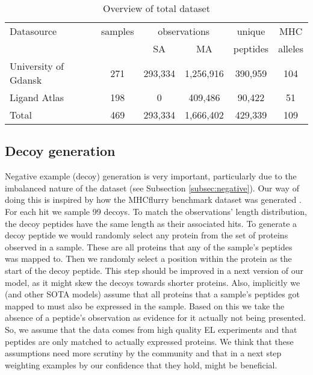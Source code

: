 \documentclass[msc,deptreport,ai]{infthesis} %
\begin{document}
	
		\begin{table}[H]
		\vskip 3mm
		\begin{center}
		\begin{small}
		\begin{sc}
		\begin{tabular}{| l | c | c c | c | c |}
		\hline
		Datasource			& samples		& \multicolumn{2}{c|}{observations} 	& unique  		& \gls{MHC} \\
						&			& \gls{SA}		& \gls{MA}		& peptides		& alleles \\
		\hline
		\hline
		University of Gdansk	& 271			& 293,334		& 1,256,916		& 390,959		& 104 \\
		Ligand Atlas			& 198			& 0			& 409,486		& 90,422		& 51 \\
		\hline
		Total				& 469			& 293,334		& 1,666,402		& 429,339		& 109 \\			
		\hline
		\end{tabular}
		\end{sc}
		\end{small}
		\caption{Overview of total dataset}
		\label{tab:datasources}
		\end{center}
		\vskip -7mm
		\end{table}
			
	
		\subsection{Decoy generation}
		\label{subsec:method_decoygeneration}
	
			Negative example (decoy) generation is very important, particularly due to the imbalanced nature of the dataset (see Subsection \ref{subsec:negative}). Our way of doing this is inspired by how the MHCflurry benchmark dataset was generated \cite{odonnell_mhcflurry_2020}. For each hit we sample 99 decoys. To match the observations' length distribution, the decoy peptides have the same length as their associated hits. To generate a decoy peptide we would randomly select any  protein from  the set of proteins observed in a sample. These are all proteins that any of the sample's peptides was mapped to. Then we randomly select a position within the protein as the start of the decoy peptide. This step should be improved in a next version of our model, as it might skew the decoys towards shorter proteins. Also, implicitly we (and other \gls{SOTA} models) assume that all proteins that a sample's peptides got mapped to must also be expressed in the sample. Based on this we take the absence of a peptide's observation as evidence for it actually not being presented. So, we assume that the data comes from high quality \gls{EL} experiments and that peptides are only matched to actually expressed proteins. We think that these assumptions need more scrutiny by the community and that  in a next step weighting examples by our confidence that they hold, might be beneficial.
			
\end{document}
